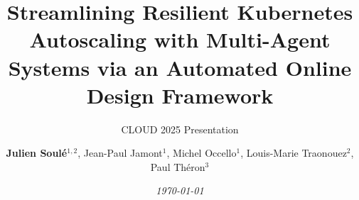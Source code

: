 \author{
    \textbf{Julien Soulé}$^{1,2}$, Jean-Paul Jamont$^{1}$, Michel Occello$^{1}$, Louis-Marie Traonouez$^{2}$, Paul Théron$^{3}$
}

\title[Streamlining Resilient Kubernetes Autoscaling]{\textbf{Streamlining Resilient Kubernetes Autoscaling with Multi-Agent Systems via an Automated Online Design Framework}}

\subtitle{CLOUD 2025 Presentation}




\date{\textit{\footnotesize \today}}

